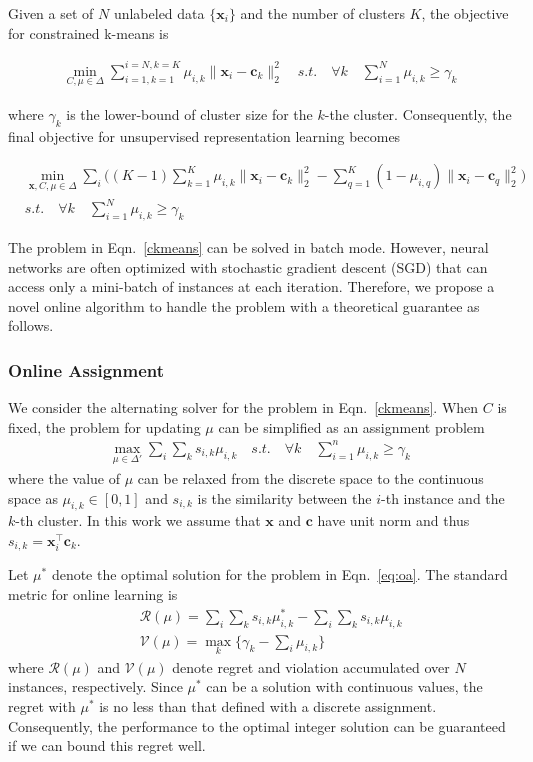 \documentclass[10pt,twocolumn,letterpaper]{article}
\def \R {\mathcal{R}}
\def \V {\mathcal{V}}
\def \x {\mathbf{x}}
\def \cc {\mathbf{c}}
\begin{document}
Given a set of $N$ unlabeled data $\{\x_i\}$ and the number of clusters $K$, the objective for constrained k-means is
\begin{footnotesize}
\begin{align}\label{ckmeans}
\min_{C, \mu\in \Delta} \sum_{i=1,k=1}^{i=N,k=K}\mu_{i,k}\|\x_i - \cc_k\|_2^2 \quad s.t.\quad \forall k\quad \sum_{i=1}^N \mu_{i,k}\geq \gamma_k
\end{align}
\end{footnotesize}
where $\gamma_k$ is the lower-bound of cluster size for the $k$-the cluster. Consequently, the final objective for unsupervised representation learning becomes
\begin{scriptsize}
\begin{align}\label{eq:ucloss}
&\min_{\x, C, \mu\in\Delta}  \sum_{i}\Big((K-1)\sum_{k=1}^K \mu_{i,k}\|\x_i-\cc_k\|_2^2 -  \sum_{q=1}^K(1-\mu_{i,q})\|\x_i-\cc_q\|_2^2\Big)\nonumber\\
&s.t. \quad \forall k\quad \sum_{i=1}^N \mu_{i,k}\geq \gamma_k
\end{align}
\end{scriptsize}

The problem in Eqn.~\ref{ckmeans} can be solved in batch mode. However, neural networks are often optimized with stochastic gradient descent (SGD) that can access only a mini-batch of instances at each iteration. Therefore, we propose a novel online algorithm to handle the problem with a theoretical guarantee as follows. 


\subsubsection{Online Assignment}
We consider the alternating solver for the problem in Eqn.~\ref{ckmeans}. When $C$ is fixed, the problem for updating $\mu$ can be simplified as an assignment problem
\begin{align}\label{eq:oa}
\max_{\mu\in\Delta'} \sum_i\sum_k s_{i,k} \mu_{i,k} \quad s.t.\quad \forall k\quad \sum_{i=1}^n \mu_{i,k}\geq \gamma_k
\end{align}
where the value of $\mu$ can be relaxed from the discrete space to the continuous space as $\mu_{i,k}\in[0,1]$ and $s_{i,k}$ is the similarity between the $i$-th instance and the $k$-th cluster. In this work we assume that $\x$ and $\cc$ have unit norm and thus $s_{i,k} = \x_i^\top \cc_k$.

Let $\mu^*$ denote the optimal solution for the problem in Eqn.~\ref{eq:oa}. The standard metric for online learning is
\begin{eqnarray*}
&&\R(\mu) = \sum_i\sum_k s_{i,k} \mu_{i,k}^* - \sum_i\sum_k s_{i,k} \mu_{i,k} \\ 
&&\V(\mu) = \max_k \{\gamma_k - \sum_i \mu_{i,k}\}
\end{eqnarray*}
where $\R(\mu)$ and $\V(\mu)$ denote regret and violation accumulated over $N$ instances, respectively. Since $\mu^*$ can be a solution with continuous values, the regret with $\mu^*$ is no less than that defined with a discrete assignment. Consequently, the performance to the optimal integer solution can be guaranteed if we can bound this regret well.
\end{document}
